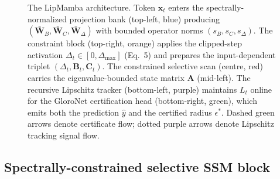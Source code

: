 \documentclass[journal,a4paper,10pt]{IEEEtran}
\theoremstyle{definition}
\theoremstyle{remark}
\newcommand{\modelname}{LipMamba}
\begin{document}
\begin{figure}[!t]
\caption{The \modelname{} architecture. Token $\mathbf{x}_t$ enters the spectrally-normalized projection bank (top-left, blue) producing $(\bar{\mathbf{W}}_B, \bar{\mathbf{W}}_C, \bar{\mathbf{W}}_\Delta)$ with bounded operator norms $(s_B, s_C, s_\Delta)$. The constraint block (top-right, orange) applies the clipped-step activation $\Delta_t \in [0, \Delta_{\max}]$ (Eq.~5) and prepares the input-dependent triplet $(\Delta_t, \mathbf{B}_t, \mathbf{C}_t)$. The constrained selective scan (centre, red) carries the eigenvalue-bounded state matrix $\mathbf{A}$ (mid-left). The recursive Lipschitz tracker (bottom-left, purple) maintains $L_t$ online for the GloroNet certification head (bottom-right, green), which emits both the prediction $\hat{y}$ and the certified radius $\epsilon^*$. Dashed green arrows denote certificate flow; dotted purple arrows denote Lipschitz tracking signal flow.}
\label{fig:architecture}
\end{figure}

\subsection{Spectrally-constrained selective SSM block}
\label{subsec:block}
\end{document}
